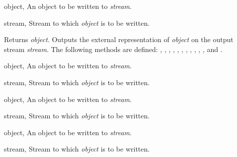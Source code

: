 \begin{optDefinition}
\begin{genericargs}
    \item[object, \classref{object}] An object to be written to {\em stream}.
    \item[stream, \classref{stream}] Stream to which {\em object\/} is to be
    written.
\end{genericargs}
%
\result%
Returns {\em object}.
%
\remarks%
Outputs the external representation of {\em object\/} on the output stream
{\em stream}.
%
\seealso%
The following  methods are defined:
, ,
,
,
, ,
, ,
, ,
, 
and .

\begin{specargs}
    \item[object, \classref{object}] An object to be written to {\em stream}.
    \item[stream, \classref{stream}] Stream to which {\em object\/} is to be
    written.
\end{specargs}

\begin{specargs}
    \item[object, \classref{object}] An object to be written to {\em stream}.
    \item[stream, \classref{buffered-stream}] Stream to which {\em object\/} is
    to be written.
\end{specargs}

\begin{specargs}
    \item[object, \classref{object}] An object to be written to {\em stream}.
    \item[stream, \classref{file-stream}] Stream to which {\em object\/} is
    to be written.
\end{specargs}


\end{optDefinition}
